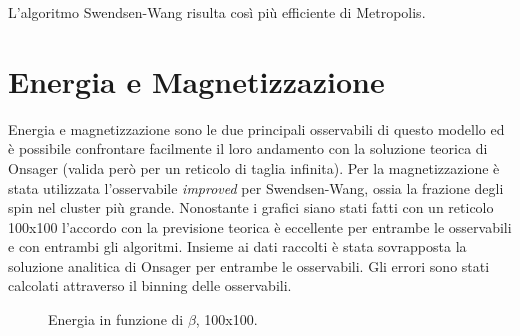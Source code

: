 L'algoritmo Swendsen-Wang risulta così più efficiente di Metropolis.
\newpage

\section{Energia e Magnetizzazione}
Energia e magnetizzazione sono le due principali osservabili di questo modello ed è possibile confrontare facilmente il loro andamento con la soluzione teorica di Onsager (valida però per un reticolo di taglia infinita).
Per la magnetizzazione è stata utilizzata l'osservabile \emph{improved} per Swendsen-Wang, ossia la frazione degli spin nel cluster più grande.
Nonostante i grafici siano stati fatti con un reticolo 100x100 l'accordo con la previsione teorica è eccellente per entrambe le osservabili e con entrambi gli algoritmi.
Insieme ai dati raccolti è stata sovrapposta la soluzione analitica di Onsager per entrambe le osservabili.
Gli errori sono stati calcolati attraverso il binning delle osservabili.
\begin{figure}[h]
\caption{Energia in funzione di $\beta$, 100x100.}
\end{figure}
